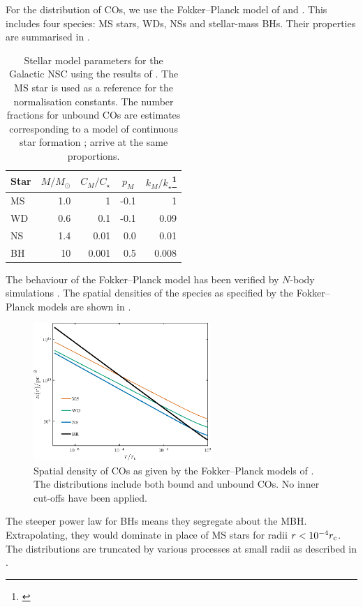 For the distribution of COs, we use the Fokker--Planck model of \citet{Hopman2006, Hopman2006a} and \citet{Alexander2009}. This includes four species: MS stars, WDs, NSs and stellar-mass BHs. Their properties are summarised in . 
\begin{table}\footnotesize
\centering
\begin{tabular}{l D{.}{.}{2.1} D{.}{.}{1.3} D{.}{.}{1.1} D{.}{.}{1.3}} 
\toprule
  Star &  &  &  &   \\ \midrule
  MS & 1.0 & 1 & -0.1 & 1 \\
  WD & 0.6 & 0.1 & -0.1 & 0.09 \\
  NS & 1.4 & 0.01 & 0.0 & 0.01  \\
  BH & 10 & 0.001 & 0.5 & 0.008 \\
\hline
\end{tabular}
\caption{Stellar model parameters for the Galactic NSC using the results of \citet{Alexander2009}. The MS star is used as a reference for the normalisation constants. The number fractions for unbound COs are estimates corresponding to a model of continuous star formation \citep{Alexander2005}; \citet{O'Leary2009} arrive at the same proportions.}\label{tab:HA}
\end{table}
The behaviour of the Fokker--Planck model has been verified by $N$-body simulations \citep{Baumgardt2004,Preto2010}. The spatial densities of the species as specified by the Fokker--Planck models are shown in . 
\begin{figure}%
  \centering
  \vspace{0.2\baselineskip}
  \includegraphics[width=0.6\textwidth]{./images/Fig_spatial_density}
    \caption{Spatial density of COs as given by the Fokker--Planck models of \citet{Alexander2009}. The distributions include both bound and unbound COs. No inner cut-offs have been applied.}   
    \label{fig:spatial-density} 
\end{figure}
The steeper power law for BHs means they segregate about the MBH. Extrapolating, they would dominate in place of MS stars for radii $r < 10^{-4}r_\mathrm{c}$. The distributions are truncated by various processes at small radii as described in .

